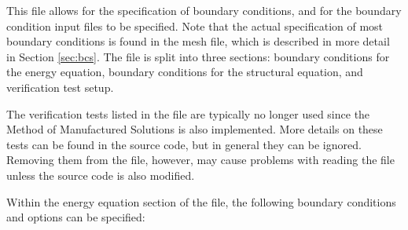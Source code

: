 \documentclass[]{article}
\begin{document}
This file allows for the specification of boundary conditions, and for the boundary condition input files to be specified. Note that the actual specification of most boundary conditions is found in the mesh file, which is described in more detail in Section \ref{sec:bcs}. The file is split into three sections: boundary conditions for the energy equation, boundary conditions for the structural equation, and verification test setup. 

The verification tests listed in the file are typically no longer used since the Method of Manufactured Solutions is also implemented. More details on these tests can be found in the source code, but in general they can be ignored. Removing them from the file, however, may cause
problems with reading the file unless the source code is also modified.

Within the energy equation section of the file, the following boundary conditions and options can be specified:
\end{document}
